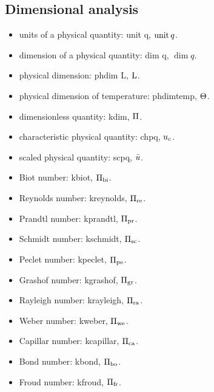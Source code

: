 \subsection{Dimensional analysis}
\begin{itemize}
\item units of a physical quantity: unit q, $\operatorname{unit} q$.
\item dimension of a physical quantity: dim q, $\dim q$.
\item physical dimension: phdim L, $\text{L}$.
\item physical dimension of temperature: phdimtemp, $\Theta$.
\item dimensionless quantity: kdim, $\Pi$.
\item characteristic physical quantity: chpq, ${u}_{c}$.
\item scaled physical quantity: scpq, $\bar{u}$.
\item Biot number: kbiot, $\Pi_\text{bi}$.
\item Reynolds number: kreynolds, $\Pi_\text{re}$.
\item Prandtl number: kprandtl, $\Pi_\text{pr}$.
\item Schmidt number: kschmidt, $\Pi_\text{sc}$.
\item Peclet number: kpeclet, $\Pi_\text{pe}$.
\item Grashof number: kgrashof, $\Pi_\text{gr}$.
\item Rayleigh number: krayleigh, $\Pi_\text{ra}$.
\item Weber number: kweber, $\Pi_\text{we}$.
\item Capillar number: kcapillar, $\Pi_\text{ca}$.
\item Bond number: kbond, $\Pi_\text{bo}$.
\item Froud number: kfroud, $\Pi_\text{fr}$.
\end{itemize}
